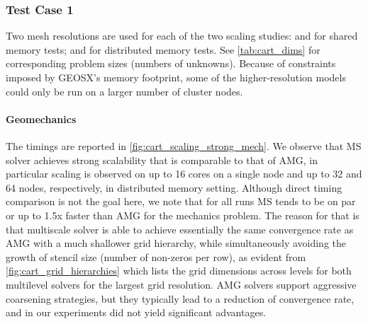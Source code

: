 \subsubsection{Test Case 1}

Two mesh resolutions are used for each of the two scaling studies:  and  for shared memory tests;  and  for distributed memory tests.   See \cref{tab:cart_dims} for corresponding problem sizes (numbers of unknowns).   Because of constraints imposed by GEOSX's memory footprint, some of the higher-resolution models could only be run on a larger number of cluster nodes.

\paragraph{Geomechanics}
The timings are reported in \cref{fig:cart_scaling_strong_mech}.   We observe that MS solver achieves strong scalability that is comparable to that of AMG, in particular scaling is observed on up to 16 cores on a single node and up to 32 and 64 nodes, respectively, in distributed memory setting.   Although direct timing comparison is not the goal here, we note that for all runs MS tends to be on par or up to 1.5x faster than AMG for the mechanics problem.   The reason for that is that multiscale solver is able to achieve essentially the same convergence rate as AMG with a much shallower grid hierarchy, while simultaneously avoiding the growth of stencil size (number of non-zeros per row), as evident from \cref{fig:cart_grid_hierarchies} which lists the grid dimensions across levels for both multilevel solvers for the largest grid resolution.   AMG solvers support aggressive coarsening strategies, but they typically lead to a reduction of convergence rate, and in our experiments did not yield significant advantages.

